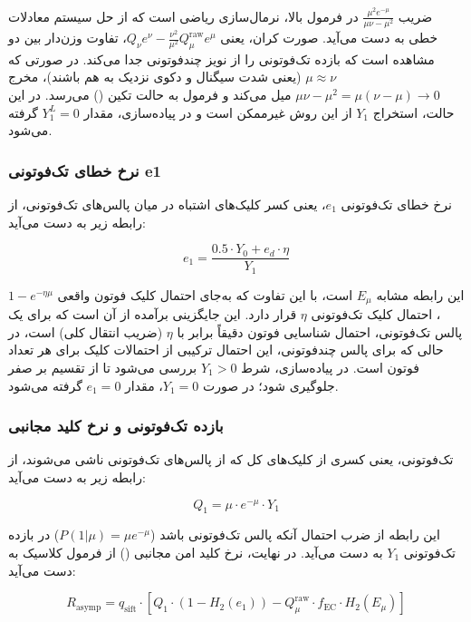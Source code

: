 ضریب $\frac{\mu^2 e^{-\mu}}{\mu \nu - \mu^2}$ در فرمول بالا، نرمال‌سازی ریاضی است که از حل سیستم معادلات خطی به دست می‌آید. صورت کران، یعنی $Q_\nu e^{\nu} - \frac{\nu^2}{\mu^2} Q_\mu^{\text{raw}} e^{\mu}$، تفاوت وزن‌دار بین دو مشاهده است که بازده تک‌فوتونی را از نویز چندفوتونی جدا می‌کند. در صورتی که $\mu \approx \nu$ (یعنی شدت سیگنال و دکوی نزدیک به هم باشند)، مخرج $\mu \nu - \mu^2 = \mu(\nu - \mu) \to 0$ میل می‌کند و فرمول به حالت تکین () می‌رسد. در این حالت، استخراج $Y_1$ از این روش غیرممکن است و در پیاده‌سازی، مقدار $Y_1^L = 0$ گرفته می‌شود.

\subsubsection{نرخ خطای تک‌فوتونی e1}

نرخ خطای تک‌فوتونی $e_1$، یعنی کسر کلیک‌های اشتباه در میان پالس‌های تک‌فوتونی، از رابطه زیر به دست می‌آید:

\begin{equation}
	e_1 = \frac{0.5 \cdot Y_0 + e_d \cdot \eta}{Y_1}
\end{equation}

این رابطه مشابه $E_\mu$ است، با این تفاوت که به‌جای احتمال کلیک فوتون واقعی $1 - e^{-\eta \mu}$، احتمال کلیک تک‌فوتونی $\eta$ قرار دارد. این جایگزینی برآمده از آن است که برای یک پالس تک‌فوتونی، احتمال شناسایی فوتون دقیقاً برابر با $\eta$ (ضریب انتقال کلی) است، در حالی که برای پالس چندفوتونی، این احتمال ترکیبی از احتمالات کلیک برای هر تعداد فوتون است. در پیاده‌سازی، شرط $Y_1 > 0$ بررسی می‌شود تا از تقسیم بر صفر جلوگیری شود؛ در صورت $Y_1 = 0$، مقدار $e_1 = 0$ گرفته می‌شود.

\subsubsection{بازده تک‌فوتونی و نرخ کلید مجانبی}

 تک‌فوتونی، یعنی کسری از کلیک‌های کل که از پالس‌های تک‌فوتونی ناشی می‌شوند، از رابطه زیر به دست می‌آید:

\begin{equation}
	Q_1 = \mu \cdot e^{-\mu} \cdot Y_1
\end{equation}

این رابطه از ضرب احتمال آنکه پالس تک‌فوتونی باشد ($P(1 | \mu) = \mu e^{-\mu}$) در بازده تک‌فوتونی $Y_1$ به دست می‌آید. در نهایت، نرخ کلید امن مجانبی () از فرمول کلاسیک  به دست می‌آید:

\begin{equation}
	R_{\text{asymp}} = q_{\text{sift}} \cdot \left[ Q_1 \cdot (1 - H_2(e_1)) - Q_\mu^{\text{raw}} \cdot f_{\text{EC}} \cdot H_2(E_\mu) \right]
\end{equation}

